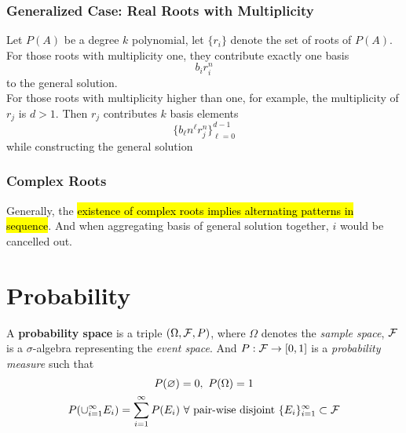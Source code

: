 \documentclass{article}
\begin{document}
				\subsubsection{Generalized Case: Real Roots with Multiplicity}
					\begin{remark}
						Let $P(A)$ be a degree $k$ polynomial, let $\{r_i\}$ denote the set of roots of $P(A)$. For those roots with multiplicity one, they contribute exactly one basis
						\begin{equation}
							b_i r_i^n	
						\end{equation}
						to the general solution. \\For those roots with multiplicity higher than one, for example, the multiplicity of $r_j$ is $d > 1$. Then $r_j$ contributes $k$ basis elements
						\begin{equation}
							\{b_{\ell} n^{\ell} r_j^n\}_{\ell = 0}^{d-1}
						\end{equation}
						while constructing the general solution
					\end{remark}
				
				\subsubsection{Complex Roots}
					\begin{remark}
						Generally, the \hl{existence of complex roots implies alternating patterns in sequence}. And when aggregating basis of general solution together, $i$ would be cancelled out.
					\end{remark}
	
	\section{Probability}
		\begin{definition}
			A \textbf{probability space} is a triple $(\Omega, \mathcal{{F}}, P)$, where $\Omega$ denotes the \emph{sample space}, $\mathcal{{F}}$ is a $\sigma$-algebra representing the \emph{event space}. And $P: \mathcal{{F}} \to [0, 1]$ is a \emph{probability measure} such that
			\begin{gather}
				P(\varnothing) = 0,\ 
				P(\Omega) = 1 \\
				P(\cup_{i=1}^\infty E_i) = \sum_{i=1}^\infty P(E_i)\ \forall \tx{ pair-wise disjoint } \{E_i\}_{i=1}^\infty \subset \mc{F}
			\end{gather}
		\end{definition}
		
\end{document}
